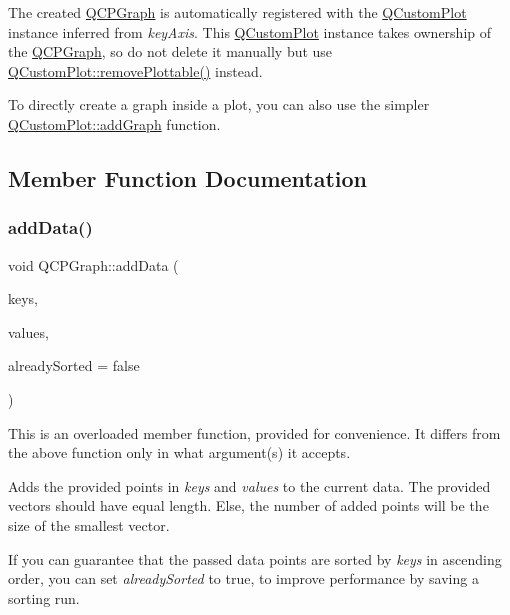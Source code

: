 The created \hyperlink{classQCPGraph}{Q\+C\+P\+Graph} is automatically registered with the \hyperlink{classQCustomPlot}{Q\+Custom\+Plot} instance inferred from {\itshape key\+Axis}. This \hyperlink{classQCustomPlot}{Q\+Custom\+Plot} instance takes ownership of the \hyperlink{classQCPGraph}{Q\+C\+P\+Graph}, so do not delete it manually but use \hyperlink{classQCustomPlot_af3dafd56884208474f311d6226513ab2}{Q\+Custom\+Plot\+::remove\+Plottable()} instead.

To directly create a graph inside a plot, you can also use the simpler \hyperlink{classQCustomPlot_a6fb2873d35a8a8089842d81a70a54167}{Q\+Custom\+Plot\+::add\+Graph} function. 

\subsection{Member Function Documentation}
\mbox{\label{classQCPGraph_ae0555c0d3fe0fa7cb8628f88158d420f}} 
\subsubsection{\texorpdfstring{add\+Data()}{addData()}\hspace{0.1cm}{\footnotesize\ttfamily [1/2]}}
{\footnotesize\ttfamily void Q\+C\+P\+Graph\+::add\+Data (\begin{DoxyParamCaption}\item[{const Q\+Vector$<$ double $>$ \&}]{keys,  }\item[{const Q\+Vector$<$ double $>$ \&}]{values,  }\item[{bool}]{already\+Sorted = {\ttfamily false} }\end{DoxyParamCaption})}

This is an overloaded member function, provided for convenience. It differs from the above function only in what argument(s) it accepts.

Adds the provided points in {\itshape keys} and {\itshape values} to the current data. The provided vectors should have equal length. Else, the number of added points will be the size of the smallest vector.

If you can guarantee that the passed data points are sorted by {\itshape keys} in ascending order, you can set {\itshape already\+Sorted} to true, to improve performance by saving a sorting run.

